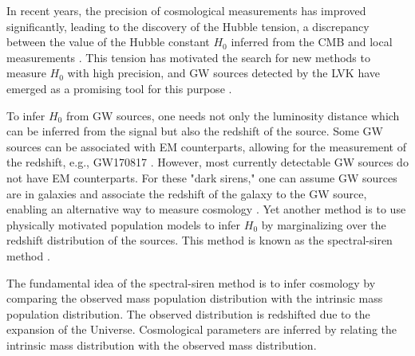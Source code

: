 \documentclass[sn-aps, pdflatex, iicol]{sn-jnl}
\begin{document}
In recent years, the precision of cosmological measurements has improved significantly, leading to the discovery of the Hubble tension, a discrepancy between the value of the Hubble constant $H_0$ inferred from the \ac{CMB} \citep{Planck:2018vyg} and local measurements \citep{Riess:2021jrx}.
This tension has motivated the search for new methods to measure $H_0$ with high precision, and \ac{GW} sources detected by the \ac{LVK} \citep{KAGRA:2013rdx, LIGOScientific:2014pky, VIRGO:2014yos, KAGRA:2020tym} have emerged as a promising tool for this purpose \citep{LIGOScientific:2017adf, LIGOScientific:2021aug, Ezquiaga:2022zkx}.

To infer $H_0$ from \ac{GW} sources, one needs not only the luminosity distance which can be inferred from the signal but also the redshift of the source.
Some \ac{GW} sources can be associated with \ac{EM} counterparts, allowing for the measurement of the redshift, e.g., GW170817 \citep{LIGOScientific:2017adf, Guidorzi:2017ogy}.
However, most currently detectable \ac{GW} sources do not have \ac{EM} counterparts.
For these "dark sirens," one can assume \ac{GW} sources are in galaxies and associate the redshift of the galaxy to the \ac{GW} source, enabling an alternative way to measure cosmology \citep{Schutz:1986gp, DelPozzo:2011vcw, Gray:2019ksv, Mukherjee:2020hyn, Mukherjee:2022afz, Gray:2023wgj}.
Yet another method is to use physically motivated population models to infer $H_0$ by marginalizing over the redshift distribution of the sources.
This method is known as the spectral-siren method \citep{Farr:2019twy, You:2020wju, Mastrogiovanni:2021wsd, LIGOScientific:2021aug, Ezquiaga:2022zkx, Karathanasis:2022rtr}.

The fundamental idea of the spectral-siren method is to infer cosmology by comparing the observed mass population distribution with the intrinsic mass population distribution.
The observed distribution is redshifted due to the expansion of the Universe.
Cosmological parameters are inferred by relating the intrinsic mass distribution with the observed mass distribution.
\end{document}

